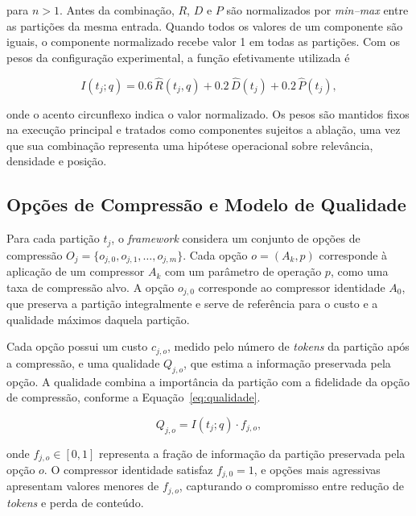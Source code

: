 para $n>1$. Antes da combinação, $R$, $D$ e $P$ são normalizados por \textit{min--max} entre as partições da mesma entrada. Quando todos os valores de um componente são iguais, o componente normalizado recebe valor 1 em todas as partições. Com os pesos da configuração experimental, a função efetivamente utilizada é

\begin{equation}
\label{eq:importancia-implementada}
I(t_j;q)=0.6\,\widehat{R}(t_j,q)
        +0.2\,\widehat{D}(t_j)
        +0.2\,\widehat{P}(t_j),
\end{equation}

onde o acento circunflexo indica o valor normalizado. Os pesos são mantidos fixos na execução principal e tratados como componentes sujeitos a ablação, uma vez que sua combinação representa uma hipótese operacional sobre relevância, densidade e posição.

\subsection{Opções de Compressão e Modelo de Qualidade}
\label{subsec:opcoes}

Para cada partição $t_j$, o \textit{framework} considera um conjunto de opções de compressão $O_j = \{o_{j,0}, o_{j,1}, \ldots, o_{j,m}\}$. Cada opção $o = (A_k, p)$ corresponde à aplicação de um compressor $A_k$ com um parâmetro de operação $p$, como uma taxa de compressão alvo. A opção $o_{j,0}$ corresponde ao compressor identidade $A_0$, que preserva a partição integralmente e serve de referência para o custo e a qualidade máximos daquela partição.

Cada opção possui um custo $c_{j,o}$, medido pelo número de \textit{tokens} da partição após a compressão, e uma qualidade $Q_{j,o}$, que estima a informação preservada pela opção. A qualidade combina a importância da partição com a fidelidade da opção de compressão, conforme a Equação~\ref{eq:qualidade}.

\begin{equation}
\label{eq:qualidade}
Q_{j,o} = I(t_j; q) \cdot f_{j,o},
\end{equation}

onde $f_{j,o} \in [0,1]$ representa a fração de informação da partição preservada pela opção $o$. O compressor identidade satisfaz $f_{j,0} = 1$, e opções mais agressivas apresentam valores menores de $f_{j,o}$, capturando o compromisso entre redução de \textit{tokens} e perda de conteúdo.

